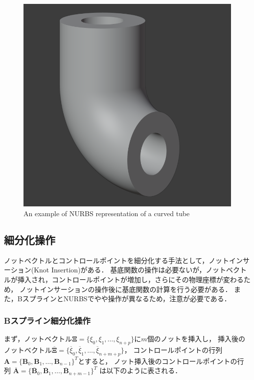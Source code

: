 \newpage

\begin{figure}[htbp]
  \centering
  \includegraphics[keepaspectratio, scale = 0.37]
  {fig/png/04.png}
  \caption{An example of NURBS representation of a curved tube}
  \label{fig:tube}
\end{figure}

\subsection{細分化操作}
ノットベクトルとコントロールポイントを細分化する手法として，ノットインサーション(Knot Insertion)がある．
基底関数の操作は必要ないが，ノットベクトルが挿入され，コントロールポイントが増加し，さらにその物理座標が変わるため，
ノットインサーションの操作後に基底関数の計算を行う必要がある．
また，BスプラインとNURBSでやや操作が異なるため，注意が必要である．

\subsubsection{Bスプライン細分化操作}
まず，ノットベクトル$\boldsymbol{\Xi} = \{\xi_0, \xi_1, \dots, \xi_{n+p}\}$に$m$個のノットを挿入し，
挿入後のノットベクトル$\overline{\boldsymbol{\Xi}} = \{\overline{\xi}_0, \overline{\xi}_1, \dots, \overline{\xi}_{n+m+p}\}$，
コントロールポイントの行列$\boldsymbol{A} = \{\boldsymbol{B}_0, \boldsymbol{B}_1, \dots, \boldsymbol{B}_{n-1}\}^T$とすると，
ノット挿入後のコントロールポイントの行列
$\overline{\boldsymbol{A}} = \{\overline{\boldsymbol{B}}_0, \overline{\boldsymbol{B}}_1, \dots, \overline{\boldsymbol{B}}_{n+m-1}\}^T$
は以下のように表される．

